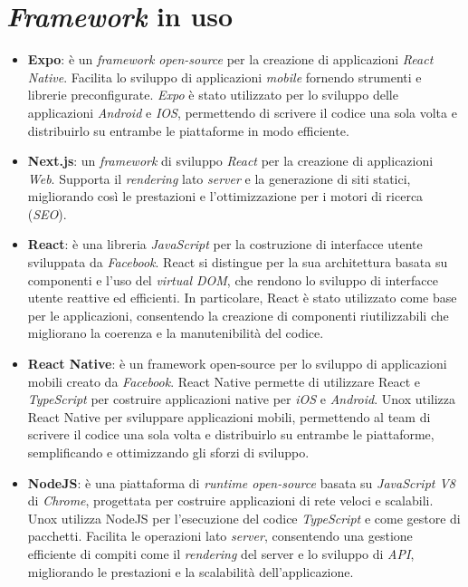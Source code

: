 \section{\textit{Framework} in uso}
\begin{itemize}
    \item \textbf{Expo}: è un \textit{framework open-source} per la creazione di applicazioni \textit{React Native}.
    Facilita lo sviluppo di applicazioni \textit{mobile} fornendo strumenti e librerie preconfigurate.
    \textit{Expo} è stato utilizzato per lo sviluppo delle applicazioni \textit{Android} e \textit{IOS}, permettendo di scrivere il codice una sola volta e distribuirlo su entrambe le piattaforme in modo efficiente.
    \item \textbf{Next.js}: un \textit{framework} di sviluppo \textit{React} per la creazione di applicazioni \textit{Web}.
    Supporta il \textit{rendering} lato \textit{server} e la generazione di siti statici, migliorando così le prestazioni e l'ottimizzazione per i motori di ricerca (\textit{SEO}).
    \item \textbf{React}: è una libreria \textit{JavaScript} per la costruzione di interfacce utente sviluppata da \textit{Facebook}. React si distingue per la sua architettura basata su componenti e l'uso del \textit{virtual DOM}, che rendono lo sviluppo di interfacce utente reattive ed efficienti. In particolare, React è stato utilizzato come base per le applicazioni, consentendo la creazione di componenti riutilizzabili che migliorano la coerenza e la manutenibilità del codice.
    \item \textbf{React Native}: è un framework open-source per lo sviluppo di applicazioni mobili creato da \textit{Facebook}. React Native permette di utilizzare React e \textit{TypeScript} per costruire applicazioni native per \textit{iOS} e \textit{Android}. Unox utilizza React Native per sviluppare applicazioni mobili, permettendo al team di scrivere il codice una sola volta e distribuirlo su entrambe le piattaforme, semplificando e ottimizzando gli sforzi di sviluppo.
    \item \textbf{NodeJS}: è una piattaforma di \textit{runtime open-source} basata su \textit{JavaScript V8} di \textit{Chrome}, progettata per costruire applicazioni di rete veloci e scalabili. Unox utilizza NodeJS per l'esecuzione del codice \textit{TypeScript} e come gestore di pacchetti. Facilita le operazioni lato \textit{server}, consentendo una gestione efficiente di compiti come il \textit{rendering} del server e lo sviluppo di \textit{API}, migliorando le prestazioni e la scalabilità dell'applicazione.
\end{itemize}

